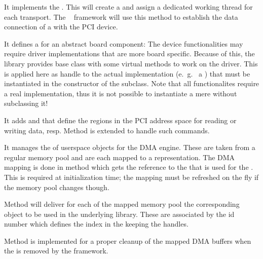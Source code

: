 \begin{compactenum} 

\item It implements the  . 
This will create a  and assign a dedicated working thread 
for each transport. The \dabc~ framework will use this method to establish
the data connection of a  with the PCI device.

\item It defines a  for an abstract board component:
The device functionalities may require driver implementations that are more
board specific. Because of this, the  library
provides base class  with some virtual methods to work on the
driver. This is applied here as handle to the actual  
implementation (e.~g.~ a )
that must be instantiated in the constructor of the
subclass. Note that all functionalites require a
real  implementation, thus it is not possible
to instantiate a mere  without subclassing it! 

\item It adds   
 and
 that define the regions in
the PCI address space for reading or writing data, resp.
Method  is extended 
to handle such commands. 

\item It manages the  of userspace 
 objects for the DMA engine.
These are taken from a regular \dabc memory pool
and are each mapped to a  representation. 
The DMA mapping is done  
in method  which gets the reference to 
the  that is used for the . 
This is required at  initialization time; 
the mapping must be refreshed 
on the fly if the memory pool changes though.

Method  
will deliver for each  of the mapped memory pool 
the corresponding  object to be used in the
underlying  library. These are associated by the 
 id number which defines 
the index in the  keeping the 
handles. 

Method  is implemented for 
a proper cleanup of the mapped DMA buffers when the 
is removed by the framework.




\end{compactenum}
